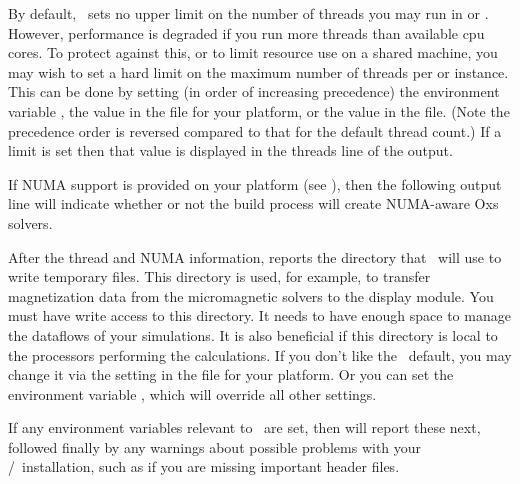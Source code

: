 By default, \OOMMF\ sets no upper limit on the number of threads you
may run in  or .  However, performance is degraded
if you run more threads than available cpu cores.  To protect against
this, or to limit resource use on a shared machine, you may wish to
set a hard limit on the maximum number of threads per  or
 instance.  This can be done by setting (in order of
increasing precedence) the environment variable
,
the  value
in the  file for your platform, or the
value in the  file.  (Note the precedence order is
reversed compared to that for the default thread count.)  If a limit
is set then that value is displayed in the threads line of the
 output.

If NUMA support is provided on your platform (see
), then the following  output line will indicate whether or not the build process
will create NUMA-aware Oxs solvers.

After the thread and NUMA information, 
reports the directory that \OOMMF\ will use to write temporary
files.  This directory is used, for example, to
transfer magnetization data from the micromagnetic solvers to the
 display module.  You must have write access to this
directory.  It needs to have enough space to manage the dataflows of
your simulations.  It is also beneficial if this directory is local to
the processors performing the calculations.  If you don't like the
\OOMMF\ default, you may change it via the
setting in the  file for your platform.  Or you
can set the environment variable
, which will
override all other settings.

If any environment variables relevant to \OOMMF\ are set, then
 will report these next, followed finally by any
warnings about possible problems with your \Tcl/\Tk\ installation, such
as if you are missing important header files.

